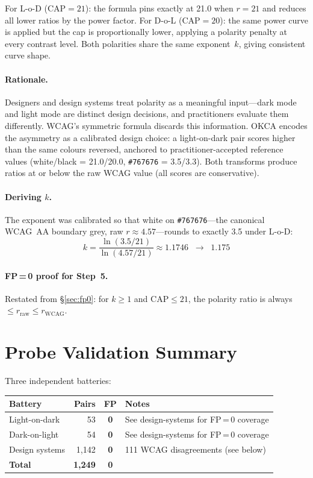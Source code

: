 \documentclass[11pt,a4paper]{article}
\begin{document}
For L-o-D ($\text{CAP} = 21$): the formula pins exactly at 21.0 when
$r = 21$ and reduces all lower ratios by the power factor.  For D-o-L
($\text{CAP} = 20$): the same power curve is applied but the cap is
proportionally lower, applying a polarity penalty at every contrast
level.  Both polarities share the same exponent~$k$, giving consistent
curve shape.

\paragraph{Rationale.}  Designers and design systems treat polarity as
a meaningful input---dark mode and light mode are distinct design
decisions, and practitioners evaluate them differently.  WCAG's
symmetric formula discards this information.  OKCA encodes the
asymmetry as a calibrated design choice: a light-on-dark pair scores
higher than the same colours reversed, anchored to
practitioner-accepted reference values (white/black = 21.0/20.0,
\texttt{\#767676} = 3.5/3.3).  Both transforms produce ratios at or
below the raw WCAG value (all scores are conservative).

\paragraph{Deriving $k$.}
The exponent was calibrated so that white on \texttt{\#767676}---the
canonical WCAG~AA boundary grey, raw $r \approx 4.57$---rounds to
exactly 3.5 under L-o-D:
\[
  k = \frac{\ln(3.5/21)}{\ln(4.57/21)} \approx 1.1746
  \;\;\rightarrow\;\; 1.175
\]

\paragraph{FP\,=\,0 proof for Step~5.}
Restated from \S\ref{sec:fp0}: for $k \ge 1$ and $\text{CAP} \le 21$,
the polarity ratio is always $\le r_{\text{raw}} \le r_{\text{WCAG}}$.

\section{Probe Validation Summary}

Three independent batteries:

\begin{table}[h]
\centering
\begin{tabular}{@{}lrcp{7cm}@{}}
\toprule
\textbf{Battery} & \textbf{Pairs} & \textbf{FP} & \textbf{Notes} \\
\midrule
Light-on-dark   & 53      & \textbf{0} & See design-systems for FP\,=\,0 coverage \\
Dark-on-light   & 54      & \textbf{0} & See design-systems for FP\,=\,0 coverage \\
Design systems  & 1{,}142 & \textbf{0} & 111 WCAG disagreements (see below) \\
\midrule
\textbf{Total}  & \textbf{1{,}249} & \textbf{0} & \\
\bottomrule
\end{tabular}
\end{table}
\end{document}
